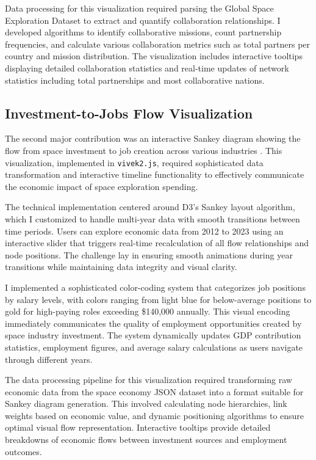 \documentclass[conference]{IEEEtran}
\begin{document}
Data processing for this visualization required parsing the Global Space Exploration Dataset to extract and quantify collaboration relationships. I developed algorithms to identify collaborative missions, count partnership frequencies, and calculate various collaboration metrics such as total partners per country and mission distribution. The visualization includes interactive tooltips displaying detailed collaboration statistics and real-time updates of network statistics including total partnerships and most collaborative nations.

\subsection{Investment-to-Jobs Flow Visualization}

The second major contribution was an interactive Sankey diagram showing the flow from space investment to job creation across various industries \cite{bostock2013sankey}. This visualization, implemented in \texttt{vivek2.js}, required sophisticated data transformation and interactive timeline functionality to effectively communicate the economic impact of space exploration spending.

The technical implementation centered around D3's Sankey layout algorithm, which I customized to handle multi-year data with smooth transitions between time periods. Users can explore economic data from 2012 to 2023 using an interactive slider that triggers real-time recalculation of all flow relationships and node positions. The challenge lay in ensuring smooth animations during year transitions while maintaining data integrity and visual clarity.

I implemented a sophisticated color-coding system that categorizes job positions by salary levels, with colors ranging from light blue for below-average positions to gold for high-paying roles exceeding \$140,000 annually. This visual encoding immediately communicates the quality of employment opportunities created by space industry investment. The system dynamically updates GDP contribution statistics, employment figures, and average salary calculations as users navigate through different years.

The data processing pipeline for this visualization required transforming raw economic data from the space economy JSON dataset into a format suitable for Sankey diagram generation. This involved calculating node hierarchies, link weights based on economic value, and dynamic positioning algorithms to ensure optimal visual flow representation. Interactive tooltips provide detailed breakdowns of economic flows between investment sources and employment outcomes.
\end{document}
